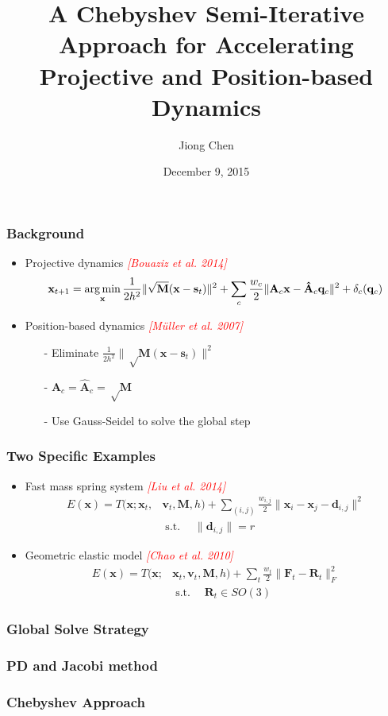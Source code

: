 \documentclass[serif,mathserif]{beamer}
\author[Jiong Chen]{Jiong Chen}
\title[\hspace{2em}\insertframenumber/\inserttotalframenumber]{\huge A Chebyshev Semi-Iterative Approach for Accelerating Projective and Position-based Dynamics}
\date{December 9, 2015} %
\newcommand{\BOLD}[1]{\mathbf{#1}}
\newcommand{\TODO}[1]{\textcolor{red}{#1}}
\newcommand{\argmin}{\operatornamewithlimits{arg\min}}
\DeclareMathOperator{\ST}{s.t.}
\begin{document}
\maketitle

\begin{frame}
 \frametitle{Background}
 \begin{itemize}
  \item Projective dynamics \TODO{\textit{[Bouaziz et al. 2014]}}
  \begin{equation*}
    \BOLD{x}_{t+1}=\argmin_{\BOLD{x}} \frac{1}{2h^2}\|\sqrt\BOLD{M}(\BOLD{x}-\BOLD{s}_t)\|^2+\sum_c\frac{w_c}{2}\|\BOLD{A}_c\BOLD{x}-\BOLD{\hat A}_c\BOLD{q}_c\|^2+\delta_c(\BOLD{q}_c)
  \end{equation*}
  \item Position-based dynamics \TODO{\textit{[M\"uller et al. 2007]}}
    \begin{itemize}
     \item[-] Eliminate $\frac{1}{2h^2}\|\sqrt\BOLD{M}(\BOLD{x}-\BOLD{s}_t)\|^2$
     \item[-] $\BOLD{A}_c = \BOLD{\hat A}_c = \sqrt \BOLD{M}$
     \item[-] Use Gauss-Seidel to solve the global step
    \end{itemize}
 \end{itemize}
\end{frame}

\begin{frame}
 \frametitle{Two Specific Examples}
 \begin{itemize}
  \item Fast mass spring system \TODO{\textit{[Liu et al. 2014]}}
  \begin{equation*}
   \begin{split}
    E(\BOLD{x})=T(\BOLD{x}; \BOLD{x}_t, &\BOLD{v}_t, \BOLD{M}, h)+ \sum_{(i, j)}\frac{w_{i, j}}{2}\|\BOLD{x}_i-\BOLD{x}_j-\BOLD{d}_{i,j}\|^2 \\
    &\ST \quad \|\BOLD{d}_{i,j}\| = r
   \end{split}
  \end{equation*}
  \item Geometric elastic model \TODO{\textit{[Chao et al. 2010]}}
  \begin{equation*}
   \begin{split}
    E(\BOLD{x})=T(\BOLD{x}; &\BOLD{x}_t, \BOLD{v}_t, \BOLD{M}, h)+ \sum_{t}\frac{w_t}{2}\|\BOLD{F}_t-\BOLD{R}_t\|_F^2 \\
    &\ST \quad \BOLD{R}_t \in SO(3)
   \end{split}
  \end{equation*}
 \end{itemize}
\end{frame}

\begin{frame}
 \frametitle{Global Solve Strategy}
\end{frame}

\begin{frame}
 \frametitle{PD and Jacobi method}
\end{frame}

\begin{frame}
  \frametitle{Chebyshev Approach}
\end{frame}

\begin{frame} 
\end{frame}
\end{document}
